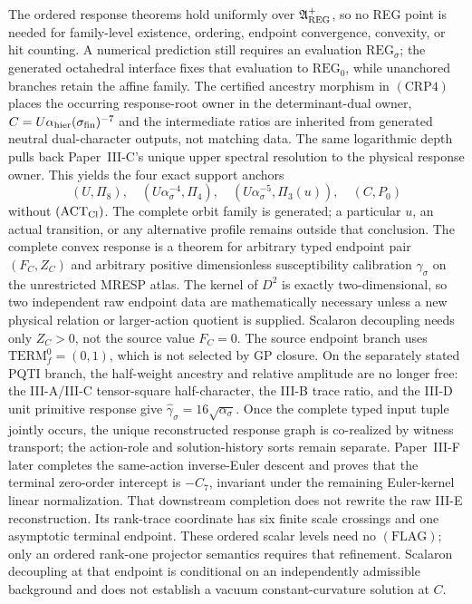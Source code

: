 \documentclass[12pt,a4paper]{article}
\begin{document}
The ordered response theorems hold uniformly over
\(\mathfrak A_{\rm REG}^{+}\), so no REG point is needed for family-level
existence, ordering, endpoint convergence, convexity, or hit counting.  A
numerical prediction still requires an evaluation
\(\mathrm{REG}_{\sigma}\); the generated octahedral interface fixes that
evaluation to \(\mathrm{REG}_0\), while unanchored branches retain the affine
family.  The certified ancestry morphism in \((\mathrm{CRP4})\) places the
occurring
response-root owner in the determinant-dual owner,
\(C=U\alpha_{\rm hier}(\sigma_{\rm fin})^{-7}\) and the intermediate
ratios are inherited from generated neutral dual-character outputs, not
matching data.  The same logarithmic depth pulls back Paper~III-C's unique
upper spectral resolution to the physical response owner.  This yields the
four exact support anchors
\[
 (U,\Pi_8),\quad
 (U\alpha_\sigma^{-4},\Pi_4),\quad
 (U\alpha_\sigma^{-5},\Pi_3(u)),\quad
 (C,P_0)
\]
without \((\mathrm{ACT}_{\rm Cl})\).  The complete orbit family is generated;
a particular \(u\), an actual transition, or any alternative profile remains
outside that conclusion.
The complete convex response is a theorem for arbitrary typed endpoint pair
\((F_C,Z_C)\) and arbitrary positive dimensionless susceptibility calibration
\(\gamma_\sigma\) on the unrestricted MRESP atlas.  The kernel of \(D^2\) is exactly two-dimensional, so two
independent raw endpoint data are mathematically necessary unless a new
physical relation or larger-action quotient is supplied.  Scalaron
decoupling needs only \(Z_C>0\), not the source value \(F_C=0\).  The source
endpoint branch uses \(\mathrm{TERM}_f^0=(0,1)\), which is not selected by GP
closure.  On the separately stated PQTI branch, the half-weight ancestry and
relative amplitude are no longer free: the III-A/III-C tensor-square
half-character, the III-B trace ratio, and the III-D unit primitive response
give \(\widehat\gamma_\sigma=16\sqrt{\alpha_\sigma}\).  Once the complete
typed input tuple jointly occurs,
the unique reconstructed response graph is co-realized by witness transport;
the action-role and solution-history sorts remain separate.  Paper~III-F later
completes the same-action inverse-Euler descent and proves that the terminal
zero-order intercept is \(-C_7\), invariant under the remaining Euler-kernel
linear normalization.  That downstream completion does not rewrite the raw
III-E reconstruction.
Its rank-trace coordinate has six
finite scale crossings and one asymptotic terminal endpoint.  These ordered
scalar levels need no \((\mathrm{FLAG})\); only an ordered rank-one projector
semantics requires that refinement.  Scalaron decoupling at
that endpoint is conditional on an independently admissible background and
does not establish a vacuum constant-curvature solution at \(C\).
\end{document}
